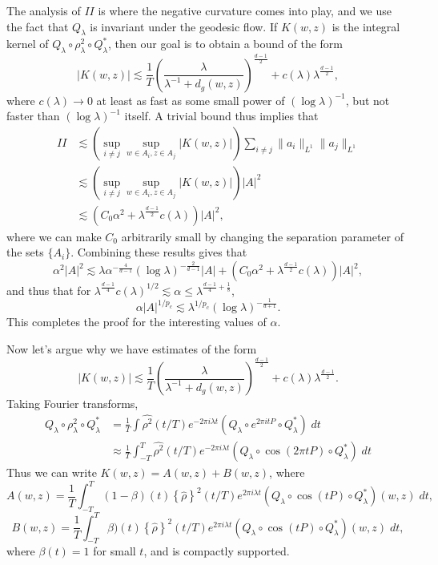 \documentclass{article}
\theoremstyle{plain}
\theoremstyle{remark}
\theoremstyle{definition}
\begin{document}
The analysis of $II$ is where the negative curvature comes into play, and we use the fact that $Q_\lambda$ is invariant under the geodesic flow. If $K(w,z)$ is the integral kernel of $Q_\lambda \circ \rho_\lambda^2 \circ Q_\lambda^*$, then our goal is to obtain a bound of the form
%
\[ |K(w,z)| \lesssim \frac{1}{T} \left( \frac{\lambda}{\lambda^{-1} + d_g(w,z)} \right)^{\frac{d-1}{2}} + c(\lambda) \lambda^{\frac{d-1}{2}}, \]
%
where $c(\lambda) \to 0$ at least as fast as some small power of $(\log \lambda)^{-1}$, but not faster than $(\log \lambda)^{-1}$ itself. A trivial bound thus implies that
%
\begin{align*}
    II &\lesssim \left( \sup_{i \neq j} \sup_{w \in A_i, z \in A_j} |K(w,z)| \right) \sum_{i \neq j} \| a_i \|_{L^1} \| a_j \|_{L^1}\\
    &\lesssim \left( \sup_{i \neq j} \sup_{w \in A_i, z \in A_j} |K(w,z)| \right) |A|^2\\
    &\lesssim ( C_0 \alpha^2 + \lambda^{\frac{d-1}{2}} c(\lambda) ) |A|^2,
\end{align*}
%
where we can make $C_0$ arbitrarily small by changing the separation parameter of the sets $\{ A_i \}$. Combining these results gives that
%
\[ \alpha^2 |A|^2 \lesssim \lambda \alpha^{- \frac{4}{d-1}} (\log \lambda)^{- \frac{2}{d - 1}} |A| + ( C_0 \alpha^2 + \lambda^{\frac{d-1}{2}} c(\lambda) ) |A|^2, \]
%
and thus that for $\lambda^{\frac{d-1}{4}} c(\lambda)^{1/2} \lesssim \alpha \leq \lambda^{\frac{d-1}{4} + \frac{1}{8}}$,
%
\[ \alpha |A|^{1/p_c} \lesssim \lambda^{1/p_c} (\log \lambda)^{- \frac{1}{d+1}}. \]
%
This completes the proof for the interesting values of $\alpha$.

Now let's argue why we have estimates of the form
%
\[ |K(w,z)| \lesssim \frac{1}{T} \left( \frac{\lambda}{\lambda^{-1} + d_g(w,z)} \right)^{\frac{d-1}{2}} + c(\lambda) \lambda^{\frac{d-1}{2}}. \]
%
Taking Fourier transforms,
%
\begin{align*}
    Q_\lambda \circ \rho_\lambda^2 \circ Q_\lambda^* &= \frac{1}{T} \int \widehat{\rho^2}(t/T) e^{-2 \pi i \lambda t} (Q_\lambda \circ e^{2 \pi i t P} \circ Q_\lambda^*)\; dt\\
    &\approx \frac{1}{T} \int_{-T}^T \widehat{\rho^2}(t/T) e^{-2 \pi i \lambda t} (Q_\lambda \circ \cos(2 \pi t P) \circ Q_\lambda^*)\; dt
\end{align*}
%
Thus we can write $K(w,z) = A(w,z) + B(w,z)$, where
%
\[ A(w,z) = \frac{1}{T} \int_{-T}^T (1 - \beta)(t) \left\{ \widehat{\rho} \right\}^2(t/T) e^{2 \pi i \lambda t} (Q_\lambda \circ \cos(t P) \circ Q_\lambda^*)(w,z)\; dt, \]
%
\[ B(w,z) = \frac{1}{T} \int_{-T}^T \beta)(t) \left\{ \widehat{\rho} \right\}^2(t/T) e^{2 \pi i \lambda t} (Q_\lambda \circ \cos(t P) \circ Q_\lambda^*)(w,z)\; dt, \]
%
where $\beta(t) = 1$ for small $t$, and is compactly supported.
\end{document}
